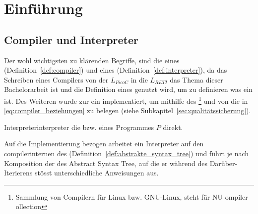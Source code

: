 \chapter{Einführung}
\label{ch:einführung}

\section{Compiler und Interpreter}
Der wohl wichtigsten zu klärenden Begriffe, sind die eines  (Definition~\ref{def:compiler}) und eines   (Definition~\ref{def:interpreter}), da das Schreiben eines Compilers von der  $L_{PicoC}$ in die  $L_{RETI}$ das Thema dieser Bachelorarbeit ist und die Definition eines  genutzt wird, um zu definieren was ein  ist. Des Weiteren wurde zur  ein  implementiert, um mithilfe des \footnote{Sammlung von Compilern für Linux bzw. GNU-Linux, steht für NU ompiler ollection} und von  die  in \ref{eq:compiler_beziehungen} zu belegen (siehe Subkapitel~\ref{sec:qualitätssicherung}).

\begin{Definition}{Interpreter}{interpreter}
   die  bzw.  eines Programmes $P$ direkt.

  Auf die Implementierung bezogen arbeitet ein Interpreter auf den compilerinternen  des  (Definition~\ref{def:abstrakte_syntax_tree}) und führt je nach Komposition der  des Abstract Syntax Tree, auf die er während des Darüber-Iterierens stösst unterschiedliche Anweisungen aus.
\end{Definition}


